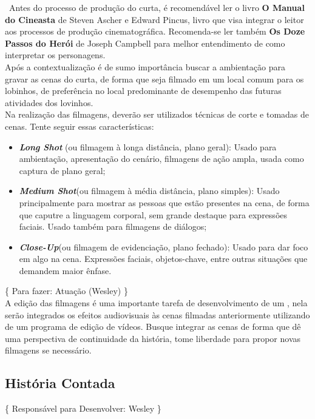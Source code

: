 			\ \indent Antes do processo de produção do curta, é recomendável ler o livro \textbf{O Manual do Cineasta} de Steven Ascher e Edward Pincus, livro que visa integrar o leitor aos processos de produção cinematográfica. Recomenda-se ler também \textbf{Os Doze Passos do Herói} de Joseph Campbell para melhor entendimento de como interpretar os personagens.
			\\ \indent Após a contextualização é de sumo importância buscar a ambientação para gravar as cenas do curta, de forma que seja filmado em um local comum para os lobinhos, de preferência no local predominante de desempenho das futuras atividades dos lovinhos.
			\\ \indent Na realização das filmagens, deverão ser utilizados técnicas de corte e tomadas de cenas. Tente seguir essas características:
			\begin{itemize}
				\item{\emph{\textbf{Long Shot}} (ou filmagem à longa distância, plano geral): Usado para ambientação, apresentação do cenário, filmagens de ação ampla, usada como captura de plano geral;}
				\item{\emph{\textbf{Medium Shot}}(ou filmagem à média distância, plano simples): Usado principalmente para mostrar as pessoas que estão presentes na cena, de forma que caputre a linguagem corporal, sem grande destaque para expressões faciais. Usado também para filmagens de diálogos;}
				\item{\emph{\textbf{Close-Up}}(ou filmagem de evidenciação, plano fechado): Usado para dar foco em algo na cena. Expressões faciais, objetos-chave, entre outras situações que demandem maior ênfase.}
			\end{itemize}
			\{ Para fazer: Atuação (Wesley) \}
			\\ \indent A edição das filmagens é uma importante tarefa de desenvolvimento de um , nela serão integrados os efeitos audiovisuais às cenas filmadas anteriormente utilizando de um programa de edição de vídeos. Busque integrar as cenas de forma que dê uma perspectiva de continuidade da história, tome liberdade para propor novas filmagens se necessário.

		\subsection[História Contada]{História Contada}
		\label{subsec:sugestoes_encenacao_historiaContada}
			\{ Responsável para Desenvolver: Wesley \}

